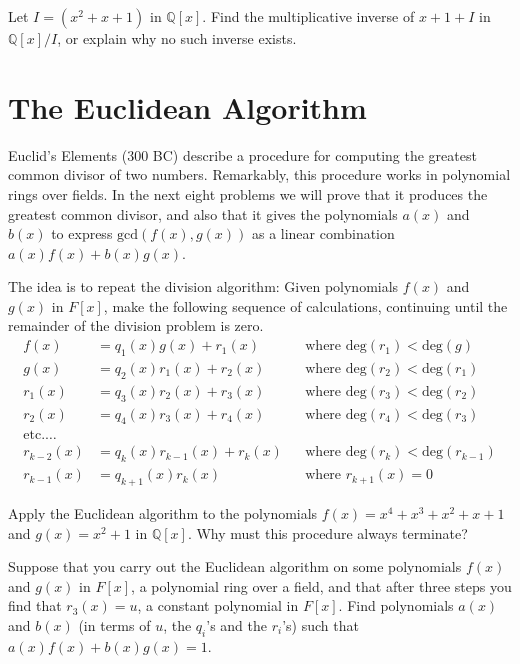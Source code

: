 \begin{problem}
Let \(I = (x^2+x+1)\) in \(\mathbb{Q}[x]\). Find the multiplicative inverse of \(x+1 +I\) in \(\mathbb{Q}[x]/I\), or explain why no such inverse exists.
\end{problem}

\section{The Euclidean Algorithm}

Euclid's Elements (300 BC) describe a procedure for computing the greatest common divisor of two numbers. Remarkably, this procedure works in polynomial rings over fields. In the next eight problems we will prove that it produces the greatest common divisor, and also that it gives the polynomials \(a(x)\) and \(b(x)\) to express \(\mbox{gcd}(f(x),g(x))\) as a linear combination \(a(x)f(x) + b(x)g(x)\).

The idea is to repeat the division algorithm: Given polynomials \(f(x)\) and \(g(x)\) in \(F[x]\), make the following sequence of calculations, continuing until the remainder of the division problem is zero.
\begin{align*}
f(x) & = q_1(x)g(x) + r_1(x) && \text{where } \mbox{deg}(r_1)<\mbox{deg}(g) \\
g(x) & = q_2(x)r_1(x) + r_2(x) && \text{where } \mbox{deg}(r_2)<\mbox{deg}(r_1) \\
r_1(x) & = q_3(x)r_2(x) + r_3(x) && \text{where } \mbox{deg}(r_3)<\mbox{deg}(r_2) \\
r_2(x) & = q_4(x)r_3(x) + r_4(x) && \text{where } \mbox{deg}(r_4)<\mbox{deg}(r_3) \\
\text{etc.}\ldots \\
r_{k-2}(x) & = q_k(x)r_{k-1}(x) + r_k(x) && \text{where } \mbox{deg}(r_k)<\mbox{deg}(r_{k-1}) \\
r_{k-1}(x) & = q_{k+1}(x)r_k(x) && \text{where } r_{k+1}(x) = 0
\end{align*}

\begin{problem}
Apply the Euclidean algorithm to the polynomials \(f(x) = x^4+x^3+x^2+x+1\) and \(g(x)=x^2+1\) in \(\mathbb{Q}[x]\). Why must this procedure always terminate?
\end{problem}

\begin{problem}
Suppose that you carry out the Euclidean algorithm on some polynomials \(f(x)\) and \(g(x)\) in \(F[x]\), a polynomial ring over a field, and that after three steps you find that \(r_3(x) = u\), a constant polynomial in \(F[x]\). Find polynomials \(a(x)\) and \(b(x)\) (in terms of \(u\), the \(q_i\)'s and the \(r_i\)'s) such that \(a(x)f(x)+b(x)g(x) = 1\).
\end{problem}


